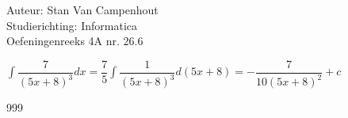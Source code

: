 \documentclass[a4paper]{article}
\begin{document}
  
\noindent \large Auteur: Stan Van Campenhout \\
\noindent \large Studierichting:  Informatica\\
\noindent \large Oefeningenreeks 4A nr. 26.6\\

\medskip

\normalsize

$ \displaystyle\int\dfrac{7}{\left(5x+8\right)^3}dx = \dfrac{7}{5}\displaystyle\int\dfrac{1}{\left(5x+8\right)^3}d\left(5x+8\right)
= -\dfrac{7}{10\left(5x+8\right)^2} + c $\\

\begin{thebibliography}{999}
\end{thebibliography}
\end{document}
